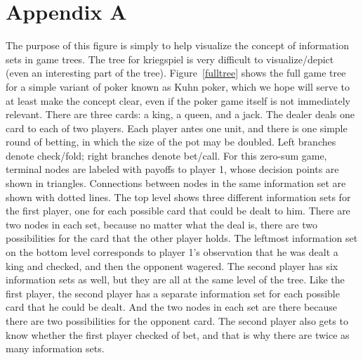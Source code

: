\documentclass[11pt]{article}
\begin{document}
\section{Appendix A}
The purpose of this figure is simply to help visualize the concept of information sets in game trees.  The tree for
kriegspiel is very difficult to visualize/depict (even an interesting part of the tree).  Figure~\ref{fulltree} shows
the full game tree for a simple variant of poker known as Kuhn poker, which we hope will serve to at least make the
concept clear, even if the poker game itself is not immediately relevant.  There are three cards: a king, a queen, and a
jack.  The dealer deals one card to each of two players.  Each player antes one unit, and there is one simple round of
betting, in which the size of the pot may be doubled.  Left branches denote check/fold; right branches denote bet/call.
For this zero-sum game, terminal nodes are labeled with payoffs to player 1, whose decision points are shown in
triangles.  Connections between nodes in the same information set are shown with dotted lines.  The top level shows
three different information sets for the first player, one for each possible card that could be dealt to him.  There are
two nodes in each set, because no matter what the deal is, there are two possibilities for the card that the other
player holds.  The leftmost information set on the bottom level corresponds to player 1's observation that he was dealt
a king and checked, and then the opponent wagered.  The second player has six information sets as well, but they are all
at the same level of the tree.  Like the first player, the second player has a separate information set for each
possible card that he could be dealt.  And the two nodes in each set are there because there are two possibilities for
the opponent card.  The second player also gets to know whether the first player checked of bet, and that is why there
are twice as many information sets.
\end{document}
